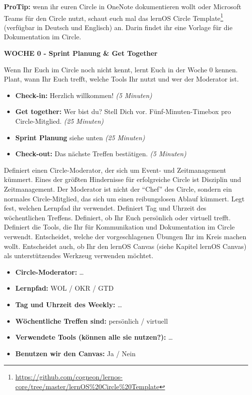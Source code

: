 \documentclass[
  ngerman,
  paper=a4,
,captions=tableheading
]{scrartcl}
\DeclareRobustCommand{\href}[2]{#2\footnote{\url{#1}}}
\providecommand{\tightlist}{%
  \setlength{\itemsep}{0pt}\setlength{\parskip}{0pt}}
\begin{document}
\textbf{ProTip:} wenn ihr euren Circle in OneNote dokumentieren wollt
oder Microsoft Teams für den Circle nutzt, schaut euch mal das
\href{https://github.com/cogneon/lernos-core/tree/master/lernOS\%20Circle\%20Template}{lernOS
Circle Template} (verfügbar in Deutsch und Englisch) an. Darin findet
ihr eine Vorlage für die Dokumentation im Circle.

\textbf{WOCHE 0 - Sprint Planung \& Get Together}

Wenn Ihr Euch im Circle noch nicht kennt, lernt Euch in der Woche 0
kennen. Plant, wann Ihr Euch trefft, welche Tools Ihr nutzt und wer der
Moderator ist.

\begin{itemize}
\tightlist
\item
  \textbf{Check-in:} Herzlich willkommen! \emph{(5 Minuten)}
\item
  \textbf{Get together:} Wer bist du? Stell Dich vor.
  Fünf-Minuten-Timebox pro Circle-Mitglied. \emph{(25 Minuten)}
\item
  \textbf{Sprint Planung} siehe unten \emph{(25 Minuten)}
\item
  \textbf{Check-out:} Das nächste Treffen bestätigen. \emph{(5 Minuten)}
\end{itemize}

Definiert einen Circle-Moderator, der sich um Event- und Zeitmanagement
kümmert. Eines der größten Hindernisse für erfolgreiche Circle ist
Disziplin und Zeitmanagement. Der Moderator ist nicht der ``Chef'' des
Circle, sondern ein normales Circle-Mitglied, das sich um einen
reibungslosen Ablauf kümmert. Legt fest, welchen Lernpfad ihr verwendet.
Definiert Tag und Uhrzeit des wöchentlichen Treffens. Definiert, ob Ihr
Euch persönlich oder virtuell trefft. Definiert die Tools, die Ihr für
Kommunikation und Dokumentation im Circle verwendt. Entscheidet, welche
der vorgeschlagenen Übungen Ihr im Kreis machen wollt. Entscheidet auch,
ob Ihr den lernOS Canvas (siehe Kapitel lernOS Canvas) als
unterstützendes Werkzeug verwenden möchtet.

\begin{itemize}
\tightlist
\item
  \textbf{Circle-Moderator:} \ldots{}
\item
  \textbf{Lernpfad:} WOL / OKR / GTD
\item
  \textbf{Tag und Uhrzeit des Weekly:} \ldots{}
\item
  \textbf{Wöchentliche Treffen sind:} persönlich / virtuell
\item
  \textbf{Verwendete Tools (können alle sie nutzen?):} \ldots{}
\item
  \textbf{Benutzen wir den Canvas:} Ja / Nein
\end{itemize}
\end{document}
